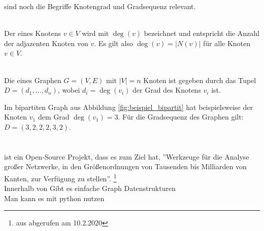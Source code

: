  sind noch die Begriffe Knotengrad und Gradsequenz relevant.
\begin{definition}[Knotengrad]~\\
Der  eines Knotens $v \in V$ wird mit $\deg(v)$ bezeichnet und entspricht die Anzahl
der adjazenten Knoten von $v$. Es gilt also $\deg(v) = |N(v)|$ für alle Knoten $v\in V$.
\end{definition}
\begin{definition}[Gradsequenz]~\\
Die  eines Graphen $G = (V,E)$ mit $|V| = n$ Knoten ist gegeben durch das Tupel
$D = (d_{1}, \dots, d_{n})$, wobei $d_{i} = \deg(v_{i})$ der Grad des Knotens $v_{i}$ ist.
\end{definition}
\noindent
Im bipartiten Graph aus Abbildung \ref{fig:beispiel_bipartit} hat beispielsweise
der Knoten $v_{1}$ dem Grad $\deg(v_{1}) = 3$. Für die Gradsequenz des Graphen gilt: 
$D = (3,2,2,2,3,2)$. 




\section{\nk}

\nk \cite{nk} ist ein Open-Source Projekt, dass es zum Ziel hat, ''Werkzeuge für die
Analyse großer Netzwerke, in den Größenordnungen von Tausenden bis Milliarden 
von Kanten, zur Verfügung zu stellen''.
\footnote{aus \cite{nk} abgerufen am 10.2.2020}
\\
Innerhalb von \nk Gibt es einfache Graph Datenstrukturen 
\\
Man kann es mit python nutzen 






